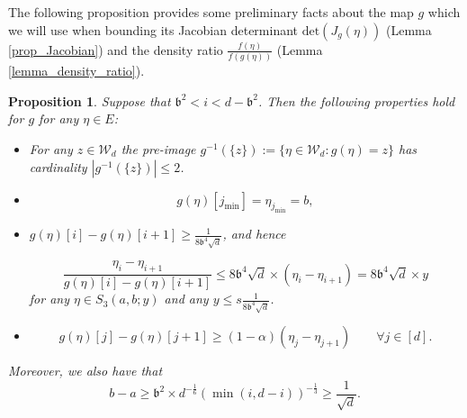 \documentclass[11pt,letterpaper]{article}
\newtheorem{proposition}[theorem]{Proposition}
\begin{document}
The following proposition provides some preliminary facts about the map $g$ which we will use when bounding its Jacobian determinant $\mathrm{det}(J_g(\eta))$ (Lemma \ref{prop_Jacobian}) and the density ratio $\frac{f(\eta)}{f(g(\eta))}$ (Lemma \ref{lemma_density_ratio}). 
%
\begin{proposition} \label{prop_map}
Suppose that  $\mathfrak{b}^2 < i < d-\mathfrak{b}^2$.
%
Then the following properties hold for $g$ for any $\eta \in E$:
%
\begin{itemize}

\item For any $z \in \mathcal{W}_d$ the pre-image $g^{-1}(\{z\}) := \{ \eta \in \mathcal{W}_d : g(\eta) = z\}$ has cardinality $|g^{-1}(\{z\}) |  \leq 2$. %

\item \begin{equation}\label{eq_n36}
    g(\eta)[j_{\mathrm{min}}] = \eta_{j_{\mathrm{min}}} = b,
\end{equation}


\item  $g(\eta)[i] -  g(\eta)[i+1]  \geq   \frac{1}{8\mathfrak{b}^4\sqrt{d}}$,  and hence  

\begin{equation}\label{eq_b5}
\frac{\eta_{i} - \eta_{i+1}}{g(\eta)[i] -  g(\eta)[i+1]}  \leq  8\mathfrak{b}^4 \sqrt{d}  \times (\eta_{i} - \eta_{i+1}) =  8 \mathfrak{b}^4 \sqrt{d}  \times y
\end{equation}
%
  for any $\eta \in  S_3(a,b;y)$ and any $y \leq s\frac{1}{8\mathfrak{b}^4\sqrt{d} }$.

\item  \begin{equation}\label{eq_b4}
g(\eta)[j] -  g(\eta)[j+1] \geq (1- \alpha)(\eta_{j} - \eta_{j+1}) \qquad \forall j \in [d].
\end{equation}
\end{itemize}

Moreover, we also have that 
%
\begin{equation}\label{eq_n42}
    b-a \geq  \mathfrak{b}^2 \times d^{-\frac{1}{6}} (\min(i, d-i))^{-\frac{1}{3}} \geq  \frac{1}{\sqrt{d}}.
\end{equation}

\end{proposition}
\end{document}
